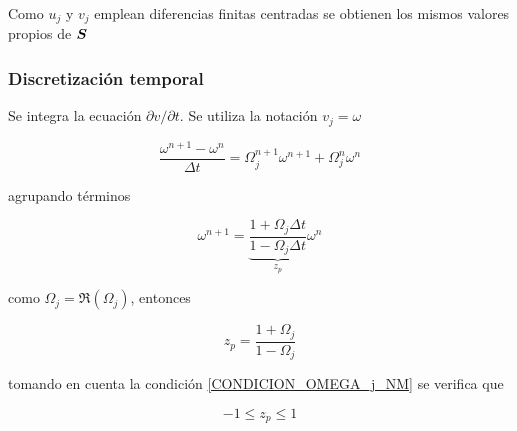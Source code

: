 Como $u_j$ y $v_j$ emplean diferencias finitas centradas se obtienen los mismos valores propios de $\boldsymbol{S}$

\subsubsection*{Discretización temporal}

Se integra la ecuación $\partial v / \partial t$. Se utiliza la notación $v_j = \omega$

\begin{equation}
\dfrac{\omega^{n+1}-\omega^n}{\Delta t} = \Omega_j^{n+1} \omega^{n+1} + \Omega_j^{n} \omega^{n}
\end{equation}

agrupando términos

\begin{equation}
\omega^{n+1} = \underbrace{ \dfrac{1+\Omega_j \Delta t}{1-\Omega_j \Delta t} }_{z_p} \omega^n
\end{equation}

como $\Omega_j = \Re(\Omega_j)$, entonces

\begin{equation} \label{zp_nm_v}
z_p = \dfrac{ 1 + \Omega_j }{ 1-\Omega_j}
\end{equation}

tomando en cuenta la condición \ref{CONDICION_OMEGA_j_NM} se verifica que

\begin{equation}
-1 \leq z_p \leq 1
\end{equation}



